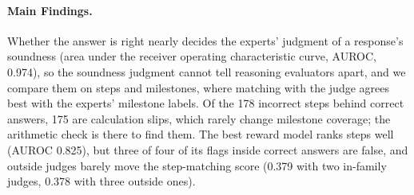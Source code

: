 \paragraph{Main Findings.} Whether the answer is right nearly decides the experts' judgment of a
response's soundness (area under the receiver operating characteristic curve, AUROC, 0.974), so
the soundness judgment cannot tell reasoning evaluators apart, and we compare them on steps and
milestones, where matching with the judge agrees best with the experts' milestone labels.
Of the 178 incorrect steps behind correct answers, 175 are calculation slips, which rarely change
milestone coverage; the arithmetic check is there to find them.
The best reward model ranks steps well (AUROC 0.825), but three of four of its flags inside correct
answers are false, and outside judges barely move the step-matching score (0.379 with two in-family
judges, 0.378 with three outside ones).

